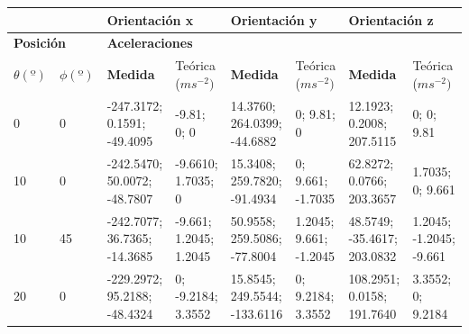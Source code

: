 \documentclass[main]{subfiles}
\begin{document}
\begin{table}[H]
\centering
\begin{tiny}
\begin{tabular}{p{30pt}p{30pt}|p{40pt}|p{26pt}|p{40pt}|p{26pt}|p{40pt}|p{26pt}|}
\hhline{~~------}
&

& \multicolumn{2}{|p{79pt}|}{\cellcolor[gray]{0.5} \centering \textbf{Orientación x}}  
& \multicolumn{2}{|p{79.5pt}|}{\cellcolor[gray]{0.5} \centering \textbf{Orientación y}}
& \multicolumn{2}{|p{78.7pt}|}{\cellcolor[gray]{0.5} \centering \textbf{Orientación z}} \\ \hline 

  \multicolumn{2}{|p{72.5pt}|}{\cellcolor[gray]{0.6}  \centering\textbf{Posición}}  
& \multicolumn{6}{|p{262.8pt}|}{\cellcolor[gray]{0.6} \centering\textbf{Aceleraciones}}  \\ \hline
  \multicolumn{1}{|p{30pt}|}{\cellcolor[gray]{0.7} $\theta(º)$}
& \multicolumn{1}{|p{30pt}|}{\cellcolor[gray]{0.7} $\phi(º)$} 
& \multicolumn{1}{|p{40pt}|}{\cellcolor[gray]{0.8} \textbf{Medida}}  
& \multicolumn{1}{|p{26.2pt}|}{\cellcolor[gray]{0.7} Teórica ($ms^{-2})$ }
& \multicolumn{1}{|p{40pt}|}{\cellcolor[gray]{0.8} \textbf{Medida}}  
& \multicolumn{1}{|p{26.7pt}|}{\cellcolor[gray]{0.7} Teórica ($ms^{-2})$ }
& \multicolumn{1}{|p{40pt}|}{\cellcolor[gray]{0.8} \textbf{Medida}}  
& \multicolumn{1}{|p{26pt}|}{\cellcolor[gray]{0.7} Teórica ($ms^{-2})$ }
\\ \hline
\multicolumn{1}{|p{30pt}|}{0}  & 0  &  -247.3172;    0.1591;    -49.4095 &       -9.81;          0;      0 & 14.3760;      264.0399;    -44.6882 &   0;          9.81;         0 & 12.1923;    0.2008;    207.5115 &      0;      0;         9.81\\ \hline
\multicolumn{1}{|p{30pt}|}{10} & 0  &  -242.5470;    50.0072;     -48.7807 &       -9.6610;    1.7035;     0 & 15.3408;       259.7820;    -91.4934 &    0;	 9.661;   -1.7035 & 62.8272;    0.0766;    203.3657 & 1.7035;     0;         9.661\\ \hline
\multicolumn{1}{|p{30pt}|}{10} & 45 & -242.7077;    36.7365;    -14.3685 & -9.661;    1.2045;     1.2045 & 50.9558;        259.5086;    -77.8004 &  1.2045;    9.661;	-1.2045     & 48.5749;    -35.4617;    203.0832 & 1.2045;     -1.2045;	-9.661    \\ \hline
\multicolumn{1}{|p{30pt}|}{20} & 0  &  -229.2972;    95.2188;    -48.4324 &       0;    -9.2184;    3.3552 & 15.8545;     249.5544;     -133.6116 & 0;          9.2184;    3.3552 & 108.2951;    0.0158;    191.7640 & 3.3552;    0;		9.2184\\ \hline

\end{tabular}
\end{tiny}
\end{table}
\end{document}
